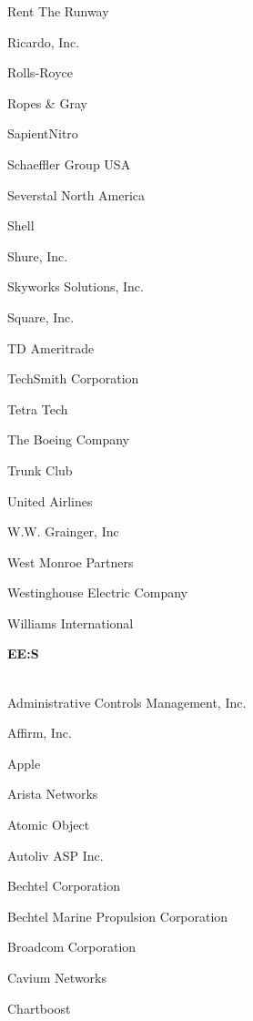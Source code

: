 \documentclass[twoside]{article}
\begin{document}
\begin{center}
\begin{multicols}{5}
\begin{FlushLeft}
\begin{compactitem}
\item Rent The Runway
\item Ricardo, Inc.
\item Rolls-Royce
\item Ropes \& Gray
\item SapientNitro
\item Schaeffler Group USA
\item Severstal North America
\item Shell
\item Shure, Inc.
\item Skyworks Solutions, Inc.
\item Square, Inc.
\item TD Ameritrade
\item TechSmith Corporation
\item Tetra Tech
\item The Boeing Company
\item Trunk Club
\item United Airlines
\item W.W. Grainger, Inc
\item West Monroe Partners
\item Westinghouse Electric Company
\item Williams International
\end{compactitem}
        \end{FlushLeft}
        \vspace{1em}
        {\fontsize{14}{16}\selectfont \bf EE:S}\\
        \vspace{-1em}
        ~\hrulefill~
        \vspace{-.9em}
        \begin{FlushLeft}
        \begin{compactitem}
        \item Administrative Controls Management, Inc.
\item Affirm, Inc.
\item Apple
\item Arista Networks
\item Atomic Object
\item Autoliv ASP Inc.
\item Bechtel Corporation
\item Bechtel Marine Propulsion Corporation
\item Broadcom Corporation
\item Cavium Networks
\item Chartboost

\end{compactitem}
\end{FlushLeft}
\end{multicols}
\end{center}
\end{document}

